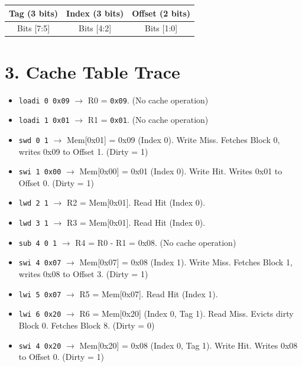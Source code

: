\documentclass[12pt,a4paper]{article}
\begin{document}
\begin{table}[H]
\centering
\begin{tabular}{|c|c|c|}
\hline
\textbf{Tag (3 bits)} & \textbf{Index (3 bits)} & \textbf{Offset (2 bits)} \\ \hline
Bits [7:5] & Bits [4:2] & Bits [1:0] \\ \hline
\end{tabular}
\end{table}

\section*{3. Cache Table Trace}

\begin{itemize}
    \item \texttt{loadi 0 0x09} $\rightarrow$ R0 = \texttt{0x09}. (No cache operation)
    \item \texttt{loadi 1 0x01} $\rightarrow$ R1 = \texttt{0x01}. (No cache operation)
    \item \texttt{swd 0 1} $\rightarrow$ Mem[0x01] = 0x09 (Index 0). Write Miss. Fetches Block 0, writes 0x09 to Offset 1. (Dirty = 1)
    \item \texttt{swi 1 0x00} $\rightarrow$ Mem[0x00] = 0x01 (Index 0). Write Hit. Writes 0x01 to Offset 0. (Dirty = 1)
    \item \texttt{lwd 2 1} $\rightarrow$ R2 = Mem[0x01]. Read Hit (Index 0).
    \item \texttt{lwd 3 1} $\rightarrow$ R3 = Mem[0x01]. Read Hit (Index 0).
    \item \texttt{sub 4 0 1} $\rightarrow$ R4 = R0 - R1 = 0x08. (No cache operation)
    \item \texttt{swi 4 0x07} $\rightarrow$ Mem[0x07] = 0x08 (Index 1). Write Miss. Fetches Block 1, writes 0x08 to Offset 3. (Dirty = 1)
    \item \texttt{lwi 5 0x07} $\rightarrow$ R5 = Mem[0x07]. Read Hit (Index 1).
    \item \texttt{lwi 6 0x20} $\rightarrow$ R6 = Mem[0x20] (Index 0, Tag 1). Read Miss. Evicts dirty Block 0. Fetches Block 8. (Dirty = 0)
    \item \texttt{swi 4 0x20} $\rightarrow$ Mem[0x20] = 0x08 (Index 0, Tag 1). Write Hit. Writes 0x08 to Offset 0. (Dirty = 1)
\end{itemize}
\end{document}
